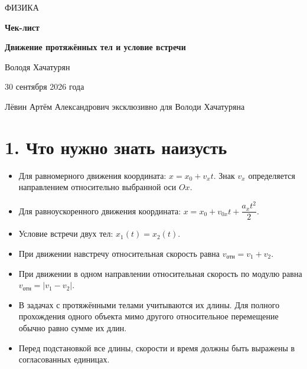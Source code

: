 \documentclass[a4paper,12pt]{article}
\newcommand{\sectionline}{\par\vspace{2mm}{\color{accent}\hrule height 0.7pt}\vspace{3mm}}
\newcommand{\checkitem}[1]{\item[$\square$] #1}
\begin{document}

\begin{titlepage}
\thispagestyle{empty}
\centering
\vspace*{24mm}
{\color{accent}\Large ФИЗИКА\par}
\vspace{8mm}
{\Huge\bfseries Чек-лист\par}
\vspace{4mm}
{\LARGE\bfseries Движение протяжённых тел и условие встречи\par}
\vspace{14mm}
{\large Володя Хачатурян\par}
\vspace{5mm}
{\large 30 сентября 2026 года\par}
\vfill
{\small\color{textgray}Лёвин Артём Александрович эксклюзивно для Володи Хачатуряна\par}
\vspace{15mm}
\end{titlepage}
\clearpage
{}

\section*{1. Что нужно знать наизусть}
\sectionline
\begin{itemize}
\checkitem{Для равномерного движения координата: \(x=x_0+v_x t\). Знак \(v_x\) определяется направлением относительно выбранной оси \(Ox\).}
\checkitem{Для равноускоренного движения координата: \(x=x_0+v_{0x}t+\dfrac{a_x t^2}{2}\).}
\checkitem{Условие встречи двух тел: \(\boxed{x_1(t)=x_2(t)}\).}
\checkitem{При движении навстречу относительная скорость равна \(v_{\text{отн}}=v_1+v_2\).}
\checkitem{При движении в одном направлении относительная скорость по модулю равна \(v_{\text{отн}}=|v_1-v_2|\).}
\checkitem{В задачах с протяжёнными телами учитываются их длины. Для полного прохождения одного объекта мимо другого относительное перемещение обычно равно сумме их длин.}
\checkitem{Перед подстановкой все длины, скорости и время должны быть выражены в согласованных единицах.}
\end{itemize}
\end{document}
